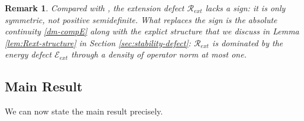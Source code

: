 \documentclass[12pt,a4paper,twoside]{article}
\newtheorem{rmk}{Remark}
\numberwithin{equation}{section}%
\begin{document}
	\begin{rmk}\label{rem:no-sign}
		Compared with \cite{BeFH2020d}, the extension defect $\mathcal R_{ext}$ lacks a
		sign: it is only symmetric, not positive semidefinite. What replaces the sign is the
		absolute continuity \eqref{dm-compE} along with the explict structure that we discuss in Lemma \ref{lem:Rext-structure} in Section \ref{sec:stability-defect}: $\mathcal R_{ext}$ is dominated by the energy defect
		$\mathcal E_{ext}$ through a density of operator norm at most one. 
	\end{rmk}
	

	
	
	\subsection{Main Result}\label{sec:main-result}
	
We can now state the main result precisely.
	
\end{document}
